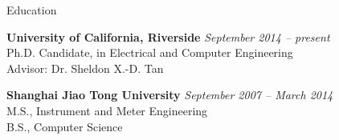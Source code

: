 \documentclass{resume} %
\begin{document}

\begin{rSection}{Education}

{\bf University of California, Riverside} \hfill {\em September 2014 -- present} \\
Ph.D. Candidate, in Electrical and Computer Engineering \\
Advisor: Dr. Sheldon X.-D. Tan

{\bf Shanghai Jiao Tong University} \hfill {\em September 2007 -- March 2014} \\
M.S., Instrument and Meter Engineering\\
B.S., Computer Science

\end{rSection}

\end{document}
